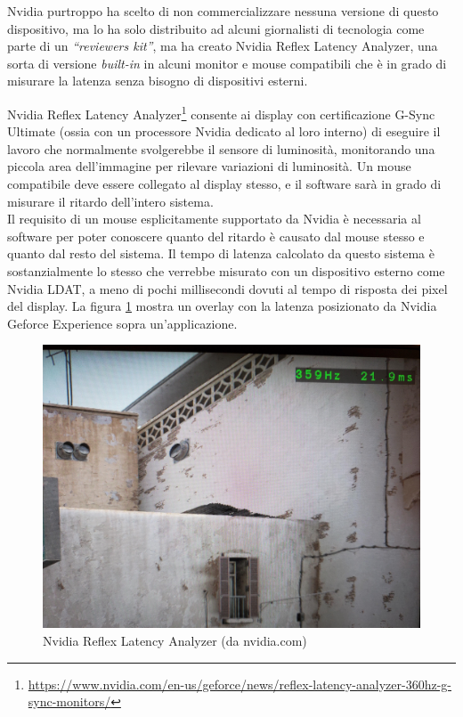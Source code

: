 Nvidia purtroppo ha scelto di non commercializzare nessuna versione di questo dispositivo, ma lo ha solo distribuito ad alcuni giornalisti di tecnologia come parte di un \textit{``reviewers kit''}, ma ha creato Nvidia Reflex Latency Analyzer, una sorta di versione \textit{built-in} in alcuni monitor e mouse compatibili che è in grado di misurare la latenza senza bisogno di dispositivi esterni.

Nvidia Reflex Latency Analyzer\footnote{\href{https://www.nvidia.com/en-us/geforce/news/reflex-latency-analyzer-360hz-g-sync-monitors/}{https://www.nvidia.com/en-us/geforce/news/reflex-latency-analyzer-360hz-g-sync-monitors/}} consente ai display con certificazione G-Sync Ultimate (ossia con un processore Nvidia dedicato al loro interno) di eseguire il lavoro che normalmente svolgerebbe il sensore di luminosità, monitorando una piccola area dell'immagine per rilevare variazioni di luminosità. Un mouse compatibile deve essere collegato al display stesso, e il software sarà in grado di misurare il ritardo dell'intero sistema.\\
Il requisito di un mouse esplicitamente supportato da Nvidia è necessaria al software per poter conoscere quanto del ritardo è causato dal mouse stesso e quanto dal resto del sistema. Il tempo di latenza calcolato da questo sistema è sostanzialmente lo stesso che verrebbe misurato con un dispositivo esterno come Nvidia LDAT, a meno di pochi millisecondi dovuti al tempo di risposta dei pixel del display. La figura \ref{fig:nvreflex_example} mostra un overlay con la latenza posizionato da Nvidia Geforce Experience sopra un'applicazione.

\begin{figure}[h!]
	\centering
	\includegraphics[width=\textwidth]{StatoDellArte_files/nvreflex_example.jpg}
	\caption{Nvidia Reflex Latency Analyzer (da nvidia.com)}
	\label{fig:nvreflex_example}
\end{figure}


